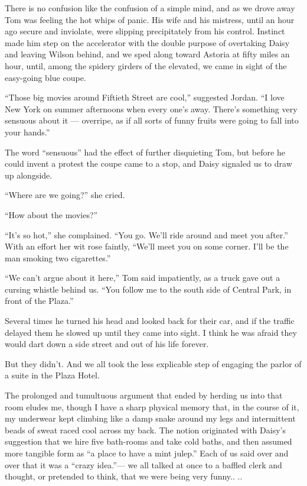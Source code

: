 \documentclass{znotebook}
\begin{document}
There is no confusion like the confusion of a simple mind, and as we drove away Tom was feeling the hot whips of panic. His wife and his mistress, until an hour ago secure and inviolate, were slipping precipitately from his control. Instinct made him step on the accelerator with the double purpose of overtaking Daisy and leaving Wilson behind, and we sped along toward Astoria at fifty miles an hour, until, among the spidery girders of the elevated, we came in sight of the easy-going blue coupe.

``Those big movies around Fiftieth Street are cool,'' suggested Jordan. ``I love New York on summer afternoons when every one's away. There's something very sensuous about it — overripe, as if all sorts of funny fruits were going to fall into your hands.''

The word ``sensuous'' had the effect of further disquieting Tom, but before he could invent a protest the coupe came to a stop, and Daisy signaled us to draw up alongside.

``Where are we going?'' she cried.

``How about the movies?''

``It's so hot,'' she complained. ``You go. We'll ride around and meet you after.'' With an effort her wit rose faintly, ``We'll meet you on some corner. I'll be the man smoking two cigarettes.''

``We can't argue about it here,'' Tom said impatiently, as a truck gave out a cursing whistle behind us. ``You follow me to the south side of Central Park, in front of the Plaza.''

Several times he turned his head and looked back for their car, and if the traffic delayed them he slowed up until they came into sight. I think he was afraid they would dart down a side street and out of his life forever.

But they didn't. And we all took the less explicable step of engaging the parlor of a suite in the Plaza Hotel.

The prolonged and tumultuous argument that ended by herding us into that room eludes me, though I have a sharp physical memory that, in the course of it, my underwear kept climbing like a damp snake around my legs and intermittent beads of sweat raced cool across my back. The notion originated with Daisy's suggestion that we hire five bath-rooms and take cold baths, and then assumed more tangible form as ``a place to have a mint julep.'' Each of us said over and over that it was a ``crazy idea.''— we all talked at once to a baffled clerk and thought, or pretended to think, that we were being very funny.. ..
\end{document}
